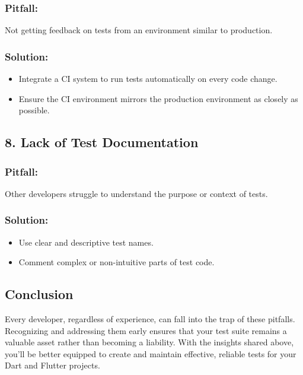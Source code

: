 \subsubsection*{Pitfall:}

Not getting feedback on tests from an environment similar to production.

\subsubsection*{Solution:}

\begin{itemize}
 \item Integrate a CI system to run tests automatically on every code change.
 \item Ensure the CI environment mirrors the production environment as closely as possible.
\end{itemize}

\subsection*{8. Lack of Test Documentation}

\subsubsection*{Pitfall:}

Other developers struggle to understand the purpose or context of tests.

\subsubsection*{Solution:}

\begin{itemize}
 \item Use clear and descriptive test names.
 \item Comment complex or non-intuitive parts of test code.
\end{itemize}

\subsection*{Conclusion}

Every developer, regardless of experience, can fall into the trap of these pitfalls. Recognizing and addressing them early ensures that your test suite remains a valuable asset rather than becoming a liability. With the insights shared above, you'll be better equipped to create and maintain effective, reliable tests for your Dart and Flutter projects.

